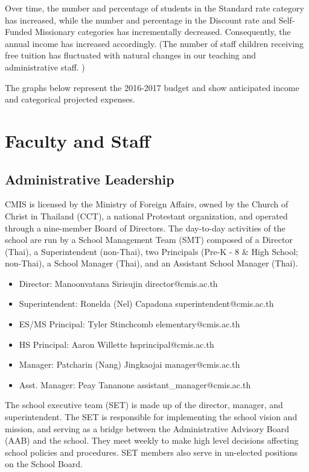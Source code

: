 Over time, the number and percentage of students in the Standard rate category has increased, while the number and percentage in the Discount rate and Self-Funded Missionary categories has incrementally decreased.  Consequently, the annual income has increased accordingly.  (The number of staff children receiving free tuition has fluctuated with natural changes in our teaching and administrative staff. )  
 

The graphs below represent the 2016-2017 budget and show anticipated income and categorical projected expenses.  


\section{Faculty and Staff}

\subsection{Administrative Leadership}

CMIS is licensed by the Ministry of Foreign Affairs, owned by the Church of Christ in Thailand (CCT), a national Protestant organization, and operated through a nine-member Board of Directors.  The day-to-day activities of the school are run by a School Management Team (SMT) composed of a Director (Thai), a Superintendent (non-Thai), two Principals (Pre-K - 8 \& High School; non-Thai), a School Manager (Thai), and an Assistant School Manager (Thai). 

\begin{itemize}
\item Director:  Manoonvatana Sirisujin         		director@cmis.ac.th
\item Superintendent:  Ronelda (Nel) Capadona	superintendent@cmis.ac.th
\item ES/MS Principal:  Tyler Stinchcomb	     	elementary@cmis.ac.th
\item HS Principal:  Aaron Willette		   	hsprincipal@cmis.ac.th	
\item Manager:  Patcharin (Nang) Jingkaojai		manager@cmis.ac.th
\item Asst. Manager:  Peay Tananone			assistant\_manager@cmis.ac.th
\end{itemize}


The school executive team (SET) is made up of the director, manager, and superintendent. The SET is responsible for implementing the school vision and mission, and serving as a bridge between the Administrative Advisory Board (AAB) and the school.  They meet weekly to make high level decisions affecting school policies and procedures.  SET members also serve in un-elected positions on the School Board.  

